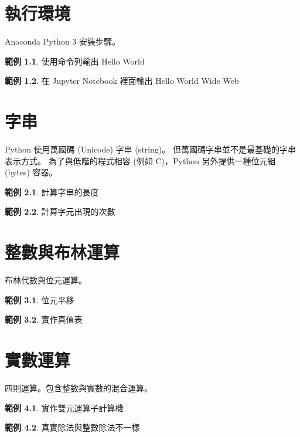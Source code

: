 \documentclass[a4paper,12pt]{book}
\theoremstyle{definition}
\newtheorem{example}{範例}[chapter]
\begin{document}
\chapter{執行環境}

Anaconda Python 3 安裝步驟。

\begin{example}
使用命令列輸出 Hello World
\end{example}

\begin{example}
在 Jupyter Notebook 裡面輸出 Hello World Wide Web
\end{example}

\chapter{字串}

Python 使用萬國碼 (Unicode) 字串 (string)。
但萬國碼字串並不是最基礎的字串表示方式。
為了與低階的程式相容 (例如 C)，Python 另外提供一種位元組 (bytes) 容器。

\begin{example}
計算字串的長度
\end{example}

\begin{example}
計算字元出現的次數
\end{example}

\chapter{整數與布林運算}

布林代數與位元運算。

\begin{example}
位元平移
\end{example}

\begin{example}
實作真值表
\end{example}

\chapter{實數運算}

四則運算。包含整數與實數的混合運算。

\begin{example}
實作雙元運算子計算機
\end{example}

\begin{example}
真實除法與整數除法不一樣
\end{example}
\end{document}
